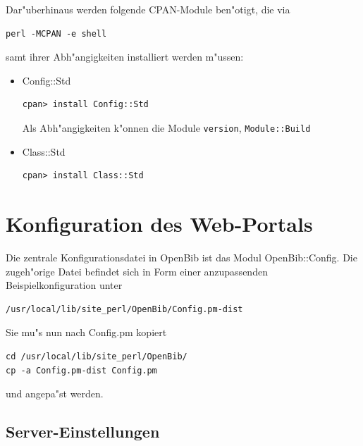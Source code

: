 \documentclass[11pt, twoside, a4paper, BCOR8mm, DIV12, bibtotoc,idxtotoc]{scrbook}
\begin{document}
Dar"uberhinaus werden folgende CPAN-Module ben"otigt, die via

\begin{verbatim}
perl -MCPAN -e shell
\end{verbatim}

samt ihrer Abh"angigkeiten installiert werden m"ussen:

\begin{itemize}
\item Config::Std
\begin{verbatim}
cpan> install Config::Std
\end{verbatim}
Als Abh"angigkeiten k"onnen die Module \texttt{version}, \texttt{Module::Build}
\item Class::Std
\begin{verbatim}
cpan> install Class::Std
\end{verbatim}
\end{itemize}
\section{Konfiguration des Web-Portals}
\label{sec:confportal}

Die zentrale Konfigurationsdatei in OpenBib ist das Modul
OpenBib::Config. Die zugeh"orige Datei befindet sich in Form einer
anzupassenden Beispielkonfiguration unter 

\begin{verbatim}
/usr/local/lib/site_perl/OpenBib/Config.pm-dist
\end{verbatim}

Sie mu"s nun nach Config.pm kopiert 

\begin{verbatim}
cd /usr/local/lib/site_perl/OpenBib/
cp -a Config.pm-dist Config.pm
\end{verbatim}

und angepa"st werden.


\subsection{Server-Einstellungen}
\end{document}
